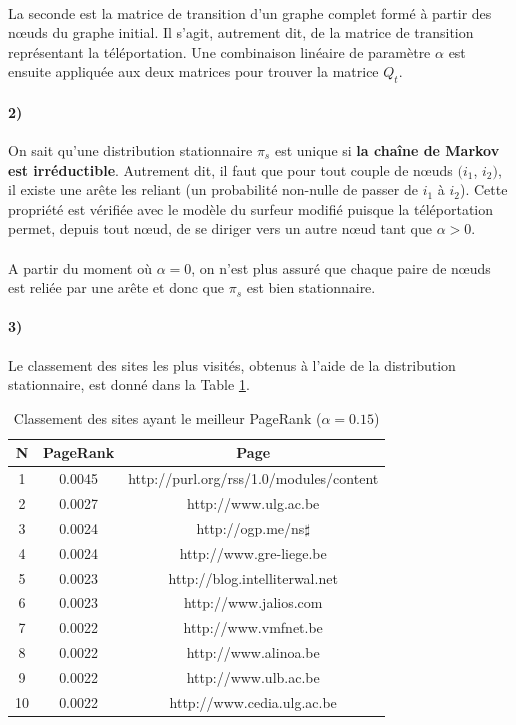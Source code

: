 \documentclass[a4paper,titlepage]{report}
\begin{document}
\paragraph{}
La seconde est la matrice de transition d'un graphe complet formé à partir des nœuds du graphe initial. Il s'agit, autrement dit, de la matrice de transition représentant la téléportation. Une combinaison linéaire de paramètre $\alpha$ est ensuite appliquée aux deux matrices pour trouver la matrice $Q_t$.
\paragraph{2)}
On sait qu'une distribution stationnaire $\pi_s$ est unique si \textbf{la chaîne de Markov est irréductible}. Autrement dit, il faut que pour tout couple de nœuds $(i_1$, $i_2)$, il existe une arête les reliant (un probabilité non-nulle de passer de $i_1$ à $i_2$). Cette propriété est vérifiée avec le modèle du surfeur modifié puisque la téléportation permet, depuis tout nœud, de se diriger vers un autre nœud tant que $\alpha > 0$. 
\paragraph{}
A partir du moment où $\alpha = 0$, on n'est plus assuré que chaque paire de nœuds est reliée par une arête et donc que $\pi_s$ est bien stationnaire.
\paragraph{3)} 
Le classement des sites les plus visités, obtenus à l'aide de la distribution stationnaire, est donné dans la Table \ref{tab:best_page_rank}.
\begin{table}[h]
	\center
	\begin{tabular}{|c|c|c|}
		\hline
		N\degre & PageRank & Page \\
		\hline
		1 & 0.0045 & http://purl.org/rss/1.0/modules/content \\
		2 & 0.0027 & http://www.ulg.ac.be \\
		3 & 0.0024 & http://ogp.me/ns$\sharp$ \\
		4 & 0.0024 & http://www.gre-liege.be  \\
		5 & 0.0023 & http://blog.intelliterwal.net  \\
		6 & 0.0023 & http://www.jalios.com  \\
		7 & 0.0022 & http://www.vmfnet.be  \\
		8 & 0.0022 & http://www.alinoa.be  \\
		9 & 0.0022 & http://www.ulb.ac.be  \\
		10 & 0.0022 & http://www.cedia.ulg.ac.be  \\
		\hline
	\end{tabular}
	\caption{Classement des sites ayant le meilleur PageRank ($\alpha = 0.15$)}
	\label{tab:best_page_rank}
\end{table}
\end{document}
